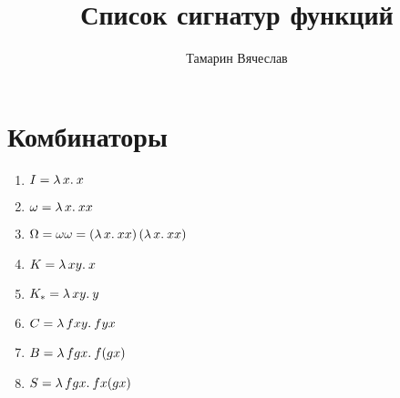 \documentclass[12pt,a4paper]{article}
\title{Список сигнатур функций}
\author{Тамарин Вячеслав}
\begin{document}
\maketitle

\section{Комбинаторы}
\begin{enumerate}[noitemsep]
	\item $ I = \lambda\,{x}.\:{x}$
	\item $ \omega = \lambda\,{x}.\:{x x}$
	\item $ \Omega = \omega \omega = \left( \lambda\,{x}.\:{x x} \right) \left( \lambda\,{x}.\:{x x} \right) $
	\item $ K = \lambda\,{x y}.\:{x}$
	\item  $ K_{*} = \lambda\,{x y}.\:{y}$
	\item $ C = \lambda\,{f x y}.\:{f y x}$ 
	\item $ B = \lambda\,{f g x}.\:{f (g x)}$
	\item $ S = \lambda\,{f g x}.\:{f x (g x)}$
\end{enumerate} 
\end{document}
